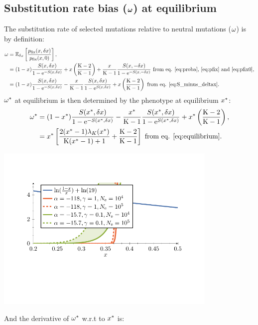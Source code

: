 \documentclass{article}
\begin{document}
\subsection{Substitution rate bias ($\bm{\omega}$) at equilibrium}
The substitution rate of selected mutations relative to neutral mutations ($\omega$) is by definition:
\begin{align}
\omega & = \operatorname{\mathbb{E}}_{\delta x} \left[ \frac{p_{\text{fix}}(x, \delta x)}{p_{\text{fix}}(x, 0)} \right], \\
 & = (1 - x) \frac{ S(x, \delta x)}{1 - \mathrm{e}^{-S(x, \delta x)}} + x \left(\frac{\text{K} - 2}{\text{K} - 1}\right) + \frac{x}{\text{K}-1} \frac{ S(x, -\delta x)}{1 - \mathrm{e}^{-S(x, -\delta x)}} \text{ from eq. \ref{eq:proba}, \ref{eq:pfix} and \ref{eq:pfix0}}, \\
 & = (1 - x) \frac{ S(x, \delta x)}{1 - \mathrm{e}^{-S(x, \delta x)}} - \frac{x}{\text{K}-1}  \frac{ S(x, \delta x)}{1 - \mathrm{e}^{S(x, \delta x)}} +  x \left(\frac{\text{K} - 2}{\text{K} - 1}\right) \text{ from eq. \ref{eq:S_minus_deltax}}.
\end{align}
$\omega^{*}$ at equilibrium is then determined by the phenotype at equilibrium $x^{*}$:
\begin{align}
\omega^{*} &= (1 - x^{*}) \frac{ S(x^{*}, \delta x)}{1 - \mathrm{e}^{-S(x^{*}, \delta x)}} - \frac{x^{*}}{\text{K}-1} \frac{ S(x^{*}, \delta x)}{1 - \mathrm{e}^{S(x^{*}, \delta x)}} + x^{*} \left(\frac{\text{K} - 2}{\text{K} - 1}\right) , \\
 &= x^{*} \left[ \frac{2 (x^{*}-1)  \lambda_{K}(x^{*}) }{\text{K} (x^{*}-1)+1} + \frac{\text{K} - 2}{\text{K} - 1}\right] \text{ from eq. \ref{eq:equilibrium}}.
\end{align}
\begin{center}
 \includegraphics[width=0.8\textwidth, page=2] {figures.pdf}
\end{center}
And the derivative of $\omega^{*}$ w.r.t to $x^{*}$ is: 
\end{document}
